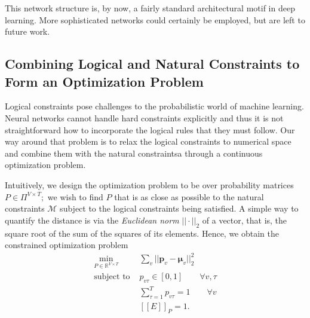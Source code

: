 \documentclass[sigplan,10pt,review,anonymous]{acmart} %
\newcommand{\qqpi}[2]{[\![#2]\!]_{#1}}
\newcommand{\margincomment}[2]{\marginpar{\scriptsize\color{Maroon}#1 says: #2}}
\newcommand{\cas}[1]{\margincomment{Charles}{#1}}
\newcommand{\ivp}[1]{\margincomment{IVP}{#1}}
\theoremstyle{plain}
\theoremstyle{remark}
\theoremstyle{definition}
\begin{document}
This network structure is, by now, a fairly standard architectural motif in deep learning.
More sophisticated networks could certainly be employed, but are left to future work.

\subsection{Combining Logical and Natural Constraints to Form an Optimization
	Problem} \label{ssec:optimisation}

Logical constraints pose challenges to the probabilistic world of
machine learning.  Neural networks cannot handle hard constraints explicitly and 
thus it is not straightforward how to incorporate the logical rules that they must follow.
Our way around that problem is to relax the logical constraints to numerical
space and combine them with the natural constraintsa through a continuous
optimization problem.

Intuitively, we design the optimization problem to be over
probability matrices $P \in \Pi^{V \times T};$ we wish to find
$P$ that is as close as possible to the natural constraints $\mathcal{M}$
subject to the logical constraints being satisfied.
A simple way to quantify the distance is via the \emph{Euclidean norm} $|| \cdot ||_2$ of a vector, that is, the square root of the sum of the squares of its elements.
%
%
Hence, we obtain the constrained optimization problem
\begin{equation}
	\begin{aligned}\label{eq:opt_naive}
		\underset{P \in \mathbb{R}^{V \times T}}{\mathrm{min}} &
		\sum_v || \bm{p}_v - \bm{\mu}_v ||_2^2                                                                  \\
		\text{subject to }                                     & p_{v\tau} \in [0, 1] \qquad \forall v, \tau    \\
		                                                       & \sum_{\tau=1}^T p_{v\tau} = 1 \qquad \forall v \\
		                                                       & \qqpi{P}{E} = 1.
	\end{aligned}
\end{equation}
\end{document}
